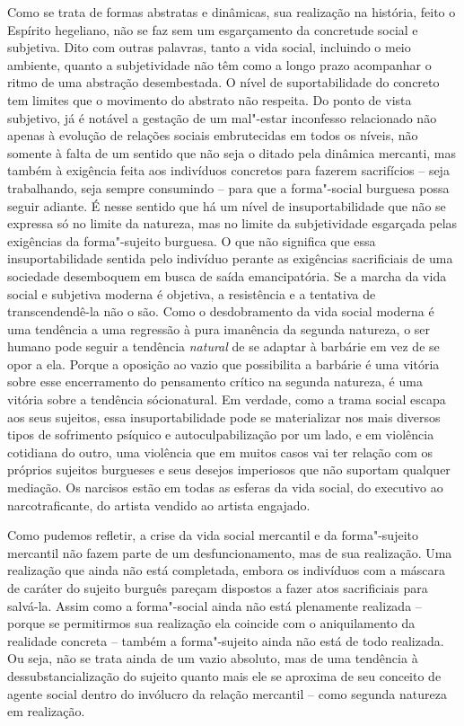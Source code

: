 Como se trata de formas abstratas e dinâmicas, sua realização na
história, feito o Espírito hegeliano, não se faz sem um esgarçamento da
concretude social e subjetiva. Dito com outras palavras, tanto a vida
social, incluindo o meio ambiente, quanto a subjetividade não têm como a
longo prazo acompanhar o ritmo de uma abstração desembestada. O nível de
suportabilidade do concreto tem limites que o movimento do abstrato não
respeita. Do ponto de vista subjetivo, já é notável a gestação de um
mal"-estar inconfesso relacionado não apenas à evolução de relações
sociais embrutecidas em todos os níveis, não somente à falta de um
sentido que não seja o ditado pela dinâmica mercanti, mas também à
exigência feita aos indivíduos concretos para fazerem sacrifícios --
seja trabalhando, seja sempre consumindo -- para que a forma"-social
burguesa possa seguir adiante. É nesse sentido que há um nível de
insuportabilidade que não se expressa só no limite da natureza, mas no
limite da subjetividade esgarçada pelas exigências da forma"-sujeito
burguesa. O que não significa que essa insuportabilidade sentida pelo
indivíduo perante as exigências sacrificiais de uma sociedade
desemboquem em busca de saída emancipatória. Se a marcha da vida social
e subjetiva moderna é objetiva, a resistência e a tentativa de
transcendendê-la não o são. Como o desdobramento da vida social moderna
é uma tendência a uma regressão à pura imanência da segunda natureza, o
ser humano pode seguir a tendência \emph{natural} de se adaptar à
barbárie em vez de se opor a ela. Porque a oposição ao vazio que
possibilita a barbárie é uma vitória sobre esse encerramento do
pensamento crítico na segunda natureza, é uma vitória sobre a tendência
sócionatural. Em verdade, como a trama social escapa aos seus sujeitos,
essa insuportabilidade pode se materializar nos mais diversos tipos de
sofrimento psíquico e autoculpabilização por um lado, e em violência
cotidiana do outro, uma violência que em muitos casos vai ter relação
com os próprios sujeitos burgueses e seus desejos imperiosos que não
suportam qualquer mediação. Os narcisos estão em todas as esferas da
vida social, do executivo ao narcotraficante, do artista vendido ao
artista engajado.

Como pudemos refletir, a crise da vida social mercantil e da
forma"-sujeito mercantil não fazem parte de um desfuncionamento, mas de
sua realização. Uma realização que ainda não está completada, embora os
indivíduos com a máscara de caráter do sujeito burguês pareçam dispostos
a fazer atos sacrificiais para salvá-la. Assim como a forma"-social ainda
não está plenamente realizada -- porque se permitirmos sua realização
ela coincide com o aniquilamento da realidade concreta -- também a
forma"-sujeito ainda não está de todo realizada. Ou seja, não se trata
ainda de um vazio absoluto, mas de uma tendência à dessubstancialização
do sujeito quanto mais ele se aproxima de seu conceito de agente social
dentro do invólucro da relação mercantil -- como segunda natureza em
realização.

